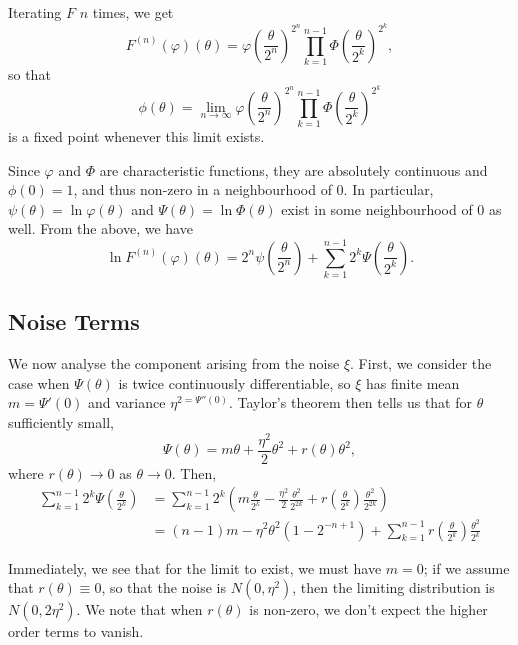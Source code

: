 \documentclass[11pt]{amsart}
\theoremstyle{remark}
\theoremstyle{definition}
\begin{document}
Iterating $F$ $n$ times, we get
\[
	F^{(n)}(\varphi)(\theta)
	=  {\textstyle \varphi\left(\frac{\theta}{2^{n}}\right)^{2^{n}}}\prod_{k=1}^{n-1} {\textstyle \Phi\left(\frac{\theta}{2^{k}}\right)^{2^{k}}},
\]
so that
\[
	\phi(\theta) = \lim_{n \to \infty} \varphi\left(\frac{\theta}{2^{n}}\right)^{2^{n}}\prod_{k=1}^{n-1}\Phi\left(\frac{\theta}{2^{k}}\right)^{2^{k}}
\]
is a fixed point whenever this limit exists.  

Since $\varphi$ and $\Phi$ are characteristic functions, they are absolutely continuous and $\phi(0) = 1$, and thus non-zero in a neighbourhood of 0. In particular, $\psi(\theta) = \ln{\varphi}(\theta)$ and $\Psi(\theta) = \ln{\Phi(\theta)}$ exist in some neighbourhood of 0 as well.  From the above, we have
\[
	\ln{F^{(n)}(\varphi)(\theta)} = {\textstyle 2^{n} \psi\left(\frac{\theta}{2^{n}}\right)} 
		+ \sum_{k=1}^{n-1}  {\textstyle 2^{k} \Psi\left(\frac{\theta}{2^{k}}\right)}.
\]

\subsection{Noise Terms}

We now analyse the component arising from the noise $\xi$.  First, we consider the case when $\Psi(\theta)$ is twice continuously differentiable, so $\xi$ has finite mean $m = \Psi'(0)$ and variance $\eta^{2 = \Psi''(0)}$.   Taylor's theorem then tells us that for $\theta$ sufficiently small, 
\[
	\Psi(\theta) = m\theta + \frac{\eta^{2}}{2} \theta^{2} + r(\theta)\theta^{2},
\]
where $r(\theta) \to 0$ as $\theta \to 0$.  Then,
\begin{align*}
	 \sum_{k=1}^{n-1}  {\textstyle 2^{k} \Psi\left(\frac{\theta}{2^{k}}\right)}
	 &=  \sum_{k=1}^{n-1} 2^{k} {\textstyle \left(m \frac{\theta}{2^{k}} - \frac{\eta^{2}}{2}  \frac{\theta^{2}}{2^{2k}}
		+ r\left(\frac{\theta}{2^{k}}\right)\frac{\theta^{2}}{2^{2k}}\right)}\\
	&= (n-1) m - \eta^{2} \theta^{2} (1 - 2^{-n+1}) 
		+ \sum_{k=1}^{n-1} {\textstyle r\left(\frac{\theta}{2^{k}}\right)\frac{\theta^{2}}{2^{k}}}
 \end{align*}

Immediately, we see that for the limit to exist, we must have $m = 0$; if we assume that $r(\theta) \equiv 0$, so that the noise is $N(0,\eta^{2})$, then the limiting distribution is $N(0,2\eta^{2})$. We note that when  $r(\theta)$ is non-zero, we don't expect the higher order terms to vanish.
\end{document}
